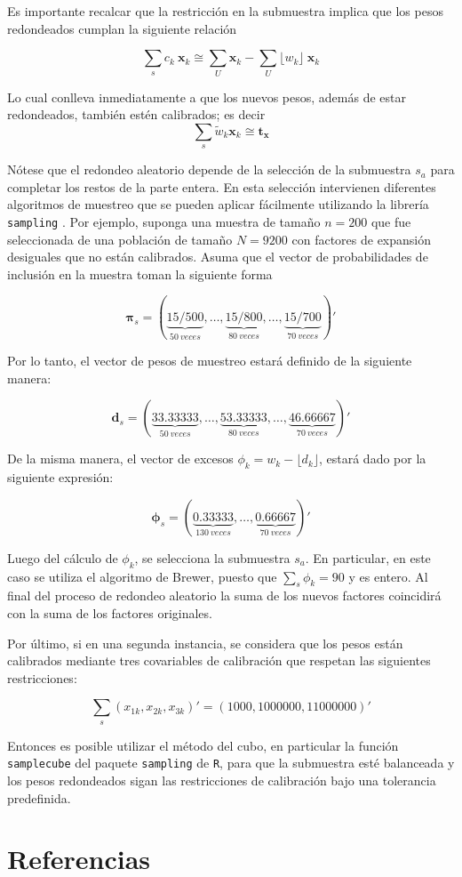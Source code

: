 \documentclass[
  10pt,
  spanish,
]{book}
\begin{document}
Es importante recalcar que la restricción en la submuestra implica que los pesos redondeados cumplan la siguiente relación

\[
\sum_s c_k \ \mathbf{x}_k 
\cong \sum_U \mathbf{x}_k 
- \sum_U \lfloor w_k \rfloor \ \mathbf{x}_k 
\]

Lo cual conlleva inmediatamente a que los nuevos pesos, además de estar redondeados, también estén calibrados; es decir
\[
\sum_s \tilde w_k \mathbf{x}_k \cong  \mathbf{t_x}
\]

Nótese que el redondeo aleatorio depende de la selección de la submuestra \(s_a\) para completar los restos de la parte entera. En esta selección intervienen diferentes algoritmos de muestreo que se pueden aplicar fácilmente utilizando la librería \texttt{sampling} \citep{Matei}. Por ejemplo, suponga una muestra de tamaño \(n= 200\) que fue seleccionada de una población de tamaño \(N=9200\) con factores de expansión desiguales que no están calibrados. Asuma que el vector de probabilidades de inclusión en la muestra toman la siguiente forma

\[
\boldsymbol{\pi}_s = (\underbrace{15/500}_{50 \ veces},
\ldots,
\underbrace{15/800}_{80 \ veces}, 
\ldots,
\underbrace{15/700}_{70 \ veces})'
\]

Por lo tanto, el vector de pesos de muestreo estará definido de la siguiente manera:

\[
\mathbf{d}_s = (\underbrace{33.33333}_{50 \ veces},
\ldots,
\underbrace{53.33333}_{80 \ veces}, 
\ldots,
\underbrace{46.66667}_{70 \ veces})'
\]

De la misma manera, el vector de excesos \(\phi_k = w_k - \lfloor d_k \rfloor\), estará dado por la siguiente expresión:

\[
\boldsymbol{\phi}_s = (\underbrace{0.33333}_{130 \ veces},
\ldots,
\underbrace{0.66667}_{70 \ veces})'
\]

Luego del cálculo de \(\phi_k\), se selecciona la submuestra \(s_a\). En particular, en este caso se utiliza el algoritmo de Brewer, puesto que \(\sum_s\phi_k = 90\) y es entero. Al final del proceso de redondeo aleatorio la suma de los nuevos factores coincidirá con la suma de los factores originales.

Por último, si en una segunda instancia, se considera que los pesos están calibrados mediante tres covariables de calibración que respetan las siguientes restricciones:

\[
\sum_{s} (x_{1k}, x_{2k}, x_{3k})' = (1000, 1000000, 11000000)'
\]

Entonces es posible utilizar el método del cubo, en particular la función \texttt{samplecube} del paquete \texttt{sampling} de \texttt{R}, para que la submuestra esté balanceada y los pesos redondeados sigan las restricciones de calibración bajo una tolerancia predefinida.

\hypertarget{referencias}{%
\chapter*{Referencias}\label{referencias}}

  
\end{document}
